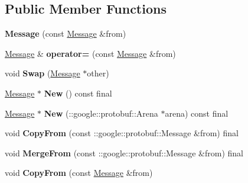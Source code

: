 \subsection*{Public Member Functions}
\begin{DoxyCompactItemize}
\item 
\mbox{\label{classtbMessages_1_1Message_a3555a1c70afe205d22d5389114db54ce}} 
{\bfseries Message} (const \hyperlink{classtbMessages_1_1Message}{Message} \&from)
\item 
\mbox{\label{classtbMessages_1_1Message_ac798f08a633e71e71a3df3824d9252fe}} 
\hyperlink{classtbMessages_1_1Message}{Message} \& {\bfseries operator=} (const \hyperlink{classtbMessages_1_1Message}{Message} \&from)
\item 
\mbox{\label{classtbMessages_1_1Message_a7701ffa7c98240fa43bbf04577c119ae}} 
void {\bfseries Swap} (\hyperlink{classtbMessages_1_1Message}{Message} $\ast$other)
\item 
\mbox{\label{classtbMessages_1_1Message_a0ddf5a7c5394527497a6adb96b850658}} 
\hyperlink{classtbMessages_1_1Message}{Message} $\ast$ {\bfseries New} () const final
\item 
\mbox{\label{classtbMessages_1_1Message_ae3347a563f1c47932bf6012f0ee898d6}} 
\hyperlink{classtbMessages_1_1Message}{Message} $\ast$ {\bfseries New} (\+::google\+::protobuf\+::\+Arena $\ast$arena) const final
\item 
\mbox{\label{classtbMessages_1_1Message_a03da79637bd4d9ff11a476b2a4358762}} 
void {\bfseries Copy\+From} (const \+::google\+::protobuf\+::\+Message \&from) final
\item 
\mbox{\label{classtbMessages_1_1Message_ac92fcafcbed43f24cb6fa0546bb76bd3}} 
void {\bfseries Merge\+From} (const \+::google\+::protobuf\+::\+Message \&from) final
\item 
\mbox{\label{classtbMessages_1_1Message_a37b9f2644d8178dc66d4a05d0d78baa3}} 
void {\bfseries Copy\+From} (const \hyperlink{classtbMessages_1_1Message}{Message} \&from)

\end{DoxyCompactItemize}
